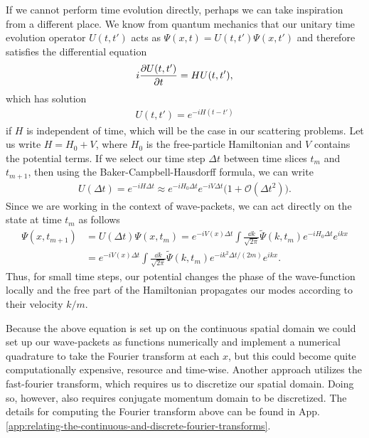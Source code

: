 If we cannot perform time evolution directly, perhaps we can take inspiration from a different place.
We know from quantum mechanics that our unitary time evolution operator $U(t,t')$ acts as $\Psi(x,t) = U(t,t') \Psi(x,t')$ and therefore satisfies the differential equation
\begin{align}
    i \pdv{U(t,t')}{t} = H U(t,t')
,\end{align}
which has solution
\begin{align}
    U(t,t') = e^{-i H (t - t')}
\end{align}
if $H$ is independent of time, which will be the case in our scattering problems.
Let us write $H = H_0 + V$, where $H_0$ is the free-particle Hamiltonian and $V$ contains the potential terms.
If we select our time step $\Delta t$ between time slices $t_{m}$ and $t_{m+1}$, then using the Baker-Campbell-Hausdorff formula, we can write
\begin{align}
    U(\Delta t) = e^{-i H \Delta t} \approx e^{-i H_0 \Delta t} e^{-i V \Delta t} \Big( 1 + \mathcal{O}(\Delta t^2) \Big)
.\end{align}
Since we are working in the context of wave-packets, we can act directly on the state at time $t_{m}$ as follows
\begin{align}
    \Psi(x,t_{m+1}) &= U(\Delta t) \Psi(x,t_{m}) = e^{-i V(x) \Delta t} \int \frac{\dd{k}}{\sqrt{2 \pi}} \widetilde{\Psi}(k,t_{m}) e^{-i H_0 \Delta t} e^{i k x} \nonumber \\
    &= e^{-i V(x) \Delta t} \int \frac{\dd{k}}{\sqrt{2 \pi}} \widetilde{\Psi}(k,t_{m}) e^{- i k^2 \Delta t / (2m)} e^{i k x}
.\end{align}
Thus, for small time steps, our potential changes the phase of the wave-function locally and the free part of the Hamiltonian propagates our modes according to their velocity $k/m$.

Because the above equation is set up on the continuous spatial domain we could set up our wave-packets as functions numerically and implement a numerical quadrature to take the Fourier transform at each $x$, but this could become quite computationally expensive, resource and time-wise.
Another approach utilizes the fast-fourier transform, which requires us to discretize our spatial domain.
Doing so, however, also requires conjugate momentum domain to be discretized.
The details for computing the Fourier transform above can be found in App. \ref{app:relating-the-continuous-and-discrete-fourier-transforms}.


\appendix

